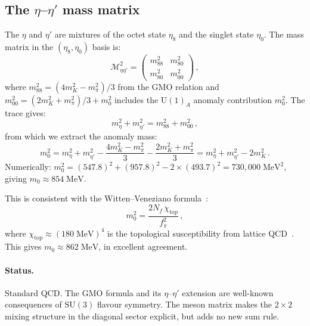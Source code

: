 \documentclass[11pt,a4paper]{article}
\newcommand{\Nf}{N_{\!f}}
\newcommand{\SU}[1]{\mathrm{SU}(#1)}
\newcommand{\UU}[1]{\mathrm{U}(#1)}
\newcommand{\fpi}{f_\pi}
\theoremstyle{plain}
\begin{document}
\subsection{The $\eta$--$\eta'$ mass matrix}

The $\eta$ and $\eta'$ are mixtures of the octet state $\eta_8$ and the
singlet state $\eta_0$.  The mass matrix in the
$(\eta_8, \eta_0)$ basis is:
\begin{equation}\label{eq:eta-mixing}
  \mathcal{M}^2_{\eta\eta'} =
  \begin{pmatrix}
    m_{88}^2 & m_{80}^2 \\
    m_{80}^2 & m_{00}^2
  \end{pmatrix}\,,
\end{equation}
where $m_{88}^2 = (4m_K^2 - m_\pi^2)/3$ from the GMO relation and
$m_{00}^2 = (2m_K^2 + m_\pi^2)/3 + m_0^2$ includes the $\UU{1}_A$
anomaly contribution $m_0^2$.  The trace gives:
\begin{equation}\label{eq:eta-trace}
  m_\eta^2 + m_{\eta'}^2 = m_{88}^2 + m_{00}^2\,,
\end{equation}
from which we extract the anomaly mass:
\begin{equation}\label{eq:anomaly-mass}
  m_0^2 = m_\eta^2 + m_{\eta'}^2 - \frac{4m_K^2 - m_\pi^2}{3}
  - \frac{2m_K^2 + m_\pi^2}{3}
  = m_\eta^2 + m_{\eta'}^2 - 2m_K^2\,.
\end{equation}
Numerically: $m_0^2 = (547.8)^2 + (957.8)^2 - 2 \times (493.7)^2
= 730{,}000\;\text{MeV}^2$, giving
$m_0 \approx 854\;\text{MeV}$.

This is consistent with the Witten--Veneziano
formula~\cite{Witten1979,Veneziano1979}:
\begin{equation}\label{eq:witten-veneziano}
  m_0^2 = \frac{2\Nf\,\chi_{\text{top}}}{\fpi^2}\,,
\end{equation}
where $\chi_{\text{top}} \approx (180\;\text{MeV})^4$ is the
topological susceptibility from lattice QCD~\cite{FLAG2024}.  This gives
$m_0 \approx 862\;\text{MeV}$, in excellent agreement.

\paragraph{Status.} Standard QCD.  The GMO formula and its
$\eta$--$\eta'$ extension are well-known consequences of $\SU{3}$
flavour symmetry.  The meson matrix makes the $2 \times 2$ mixing
structure in the diagonal sector explicit, but adds no new sum rule.


\end{document}
